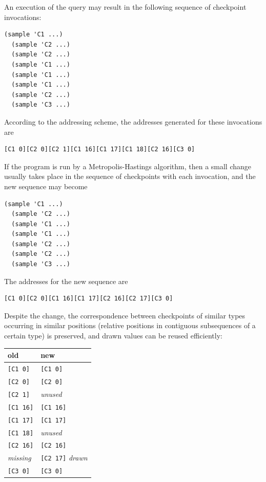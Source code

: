 \documentclass[preprint]{sigplanconf}
\begin{document}
An execution of the query may result in the following
sequence of checkpoint invocations:
\begin{lstlisting}[style=default]
  (sample 'C1 ...)
  (sample 'C2 ...)
  (sample 'C2 ...)
  (sample 'C1 ...)
  (sample 'C1 ...)
  (sample 'C1 ...)
  (sample 'C2 ...)
  (sample 'C3 ...)
\end{lstlisting}
According to the addressing scheme, the addresses generated
for these invocations are
\begin{lstlisting}[style=default]
[C1 0][C2 0][C2 1][C1 16][C1 17][C1 18][C2 16][C3 0]
\end{lstlisting}
If the program is run by a Metropolis-Hastings algorithm, then a
small change usually takes place in the sequence of checkpoints
with each invocation, and the new sequence may become
\begin{lstlisting}[style=default]
  (sample 'C1 ...)
  (sample 'C2 ...)
  (sample 'C1 ...)
  (sample 'C1 ...)
  (sample 'C2 ...)
  (sample 'C2 ...)
  (sample 'C3 ...)
\end{lstlisting}
The addresses for the new sequence are
\begin{lstlisting}[style=default]
  [C1 0][C2 0][C1 16][C1 17][C2 16][C2 17][C3 0]
\end{lstlisting}
Despite the change, the correspondence between checkpoints of
similar types occurring in similar positions (relative positions
in contiguous subsequences of a certain type) is preserved, and
drawn values can be reused efficiently:

\vspace{\baselineskip}
{
\begin{tabular}{l l}
    \textbf{old} & \textbf{new} \\ \hline
    {}\texttt{[C1 0]} & \texttt{[C1 0]} \\
    {}\texttt{[C2 0]} & \texttt{[C2 0]} \\
    {}\texttt{[C2 1]} & \textit{unused} \\
    {}\texttt{[C1 16]} & \texttt{[C1 16]} \\
    {}\texttt{[C1 17]} & \texttt{[C1 17]} \\
    {}\texttt{[C1 18]} & \textit{unused} \\
    {}\texttt{[C2 16]} & \texttt{[C2 16]} \\
    \textit{missing} & \texttt{[C2 17]} \textit{drawn}\\
    {}\texttt{[C3 0]} & \texttt{[C3 0]}
\end{tabular}
\vspace{\baselineskip}}
\end{document}
